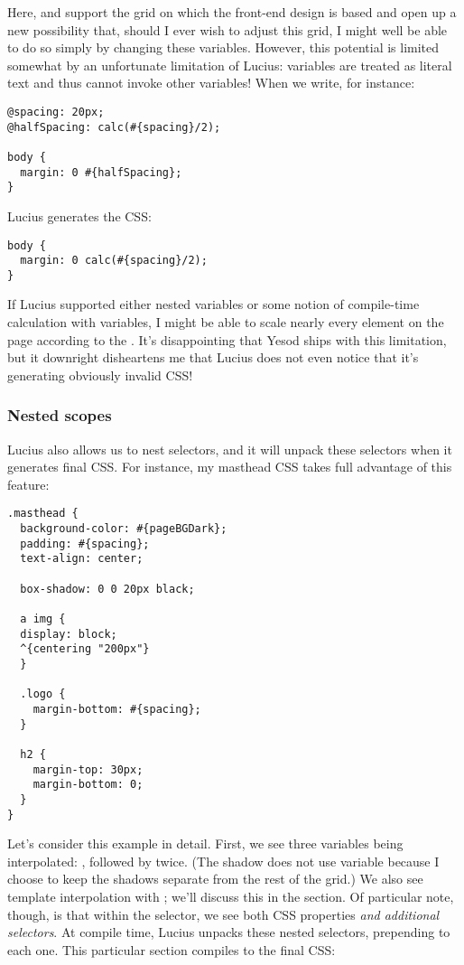 Here,  and  support the grid on which the front-end design is based and open up a new possibility that, should I ever wish to adjust this grid, I might well be able to do so simply by changing these variables. However, this potential is limited somewhat by an unfortunate limitation of Lucius: variables are treated as literal text and thus cannot invoke other variables! When we write, for instance: 

\begin{Verbatim}[samepage=true]
@spacing: 20px;
@halfSpacing: calc(#{spacing}/2);

body {
  margin: 0 #{halfSpacing};
}
\end{Verbatim}

Lucius generates the CSS:

\begin{Verbatim}[samepage=true]
body {
  margin: 0 calc(#{spacing}/2);
}
\end{Verbatim}

If Lucius supported either nested variables or some notion of compile-time calculation with variables, I might be able to scale nearly every element on the page according to the . It's disappointing that Yesod ships with this limitation, but it downright disheartens me that Lucius does not even notice that it's generating obviously invalid CSS!

\subsubsection{Nested scopes} \label{luciusNestedScopes}

Lucius also allows us to nest selectors, and it will unpack these selectors when it generates final CSS. For instance, my masthead CSS takes full advantage of this feature:

\begin{Verbatim}[samepage=true]
.masthead {
  background-color: #{pageBGDark};
  padding: #{spacing};
  text-align: center;
  
  box-shadow: 0 0 20px black;

  a img {
  display: block;
  ^{centering "200px"}
  }
  
  .logo {
    margin-bottom: #{spacing};
  }

  h2 {
    margin-top: 30px;
    margin-bottom: 0;
  }
}
\end{Verbatim}

Let's consider this example in detail. First, we see three variables being interpolated: , followed by  twice. (The shadow does not use  variable because I choose to keep the shadows separate from the rest of the grid.) We also see template interpolation with ; we'll discuss this in the  section. Of particular note, though, is that within the  selector, we see both CSS properties \emph{and additional selectors}. At compile time, Lucius unpacks these nested selectors, prepending  to each one. This particular section compiles to the final CSS:

